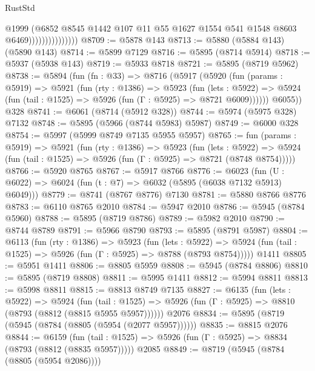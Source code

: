 \begin{lexlean}{RustStd}
\begin{coremodule}
{\begin{coremodule}
{{{{{{{{{{{{{{{{{{{{{{{{{{{{{{{{{{{                                @1999
                                (@6852
                                  @8545
                                  @1442
                                  @107
                                  @11
                                  @55
                                  @1627
                                  @1554
                                  @541
                                  @1548
                                  @8603
                                  @6469)))))))))))))))
@8709 := @5878 @143
@8713 := @5880 (@5884 @143) (@5890 @143)
@8714 := @5899 @7129
@8716 := @5895 (@8714 @5914)
@8718 := @5937 (@5938 @143)
@8719 := @5933 @8718
@8721 := @5895 (@8719 @5962)
@8738 := @5894
    (fun (fn : @33) =>
    @8716
      (@5917
        (@5920
          (fun (params : @5919) =>
          @5921
            (fun (rty : @1386) =>
            @5923
              (fun (lets : @5922) =>
              @5924 (fun (tail : @1525) => @5926 (fun (Γ : @5925) => @8721 @6009))))))
        @6055))
    @328
@8741 := @6061 (@8714 (@5912 @328))
@8744 := @5974 (@5975 @328) @7132
@8748 := @5895 (@5966 (@8744 @5983) @5987)
@8749 := @6000 @328
@8754 := @5997 (@5999 @8749 @7135 @5955 @5957)
@8765 := fun (params : @5919) =>
  @5921
    (fun (rty : @1386) =>
    @5923
      (fun (lets : @5922) =>
      @5924 (fun (tail : @1525) => @5926 (fun (Γ : @5925) => @8721 (@8748 @8754)))))
@8766 := @5920 @8765
@8767 := @5917 @8766
@8776 := @6023 (fun (U : @6022) => @6024 (fun (t : @7) => @6032 (@5895 (@6038 @7132 @5913) @6049)))
@8779 := @8741 (@8767 @8776) @7130
@8781 := @5880 @8766 @8776
@8783 := @6110 @8765 @2010
@8784 := @5947 @2010
@8786 := @5945 (@8784 @5960)
@8788 := @5895 (@8719 @8786)
@8789 := @5982 @2010
@8790 := @8744 @8789
@8791 := @5966 @8790
@8793 := @5895 (@8791 @5987)
@8804 := @6113
    (fun (rty : @1386) =>
    @5923
      (fun (lets : @5922) =>
      @5924 (fun (tail : @1525) => @5926 (fun (Γ : @5925) => @8788 (@8793 @8754)))))
    @1411
@8805 := @5951 @1411
@8806 := @8805 @5959
@8808 := @5945 (@8784 @8806)
@8810 := @5895 (@8719 @8808)
@8811 := @5995 @1411
@8812 := @5994 @8811
@8813 := @5998 @8811
@8815 := @8813 @8749 @7135
@8827 := @6135
    (fun (lets : @5922) =>
    @5924
      (fun (tail : @1525) => @5926 (fun (Γ : @5925) => @8810 (@8793 (@8812 (@8815 @5955 @5957))))))
    @2076
@8834 := @5895 (@8719 (@5945 (@8784 (@8805 (@5954 (@2077 @5957))))))
@8835 := @8815 @2076
@8844 := @6159
    (fun (tail : @1525) => @5926 (fun (Γ : @5925) => @8834 (@8793 (@8812 (@8835 @5957)))))
    @2085
@8849 := @8719 (@5945 (@8784 (@8805 (@5954 @2086))))
}}}}}}}}}}}}}}}}}}}}}}}}}}}}}}}}}}}
\end{coremodule}}
\end{coremodule}
\end{lexlean}
